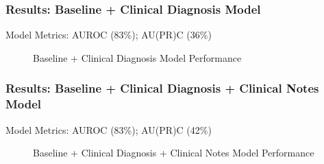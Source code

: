\documentclass{beamer}
\begin{document}
\begin{frame}
\frametitle{Results: Baseline + Clinical Diagnosis Model}

Model Metrics: AUROC (83\%); AU(PR)C (36\%)

\begin{figure}[H]
\centering     %
{}
\caption{Baseline + Clinical Diagnosis Model Performance}
\label{ImprovedModelPerformance}
\end{figure}
\end{frame}

\begin{frame}
\frametitle{Results: Baseline + Clinical Diagnosis + Clinical Notes Model}

Model Metrics: AUROC (83\%); AU(PR)C (42\%)

\begin{figure}[H]
\centering     %
{}
\caption{Baseline + Clinical Diagnosis + Clinical Notes Model Performance}
\label{BestModelPerformance}
\end{figure}
\end{frame}
\end{document}
